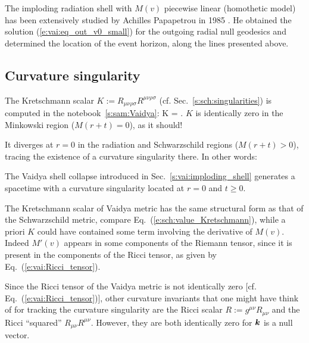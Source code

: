 \begin{hist}
The imploding radiation shell with $M(v)$ piecewise linear (homothetic model)
has been extensively
studied by Achilles Papapetrou in 1985 \cite{Papap85}.
He obtained the solution (\ref{e:vai:eq_out_v0_small}) for the outgoing radial
null geodesics and determined the location of the event horizon, along
the lines presented above.
\end{hist}

\subsection{Curvature singularity} \label{s:vai:thin:sing}

The Kretschmann scalar
$K := R_{\mu\nu\rho\sigma} R^{\mu\nu\rho\sigma}$
(cf. Sec.~\ref{s:sch:singularities})
is computed in the notebook~\ref{s:sam:Vaidya}:
\be \label{e:vai:Kretschmann}
    K =  .
\ee
$K$ is identically zero in the Minkowski region ($M(r+t) = 0$), as it should!

It diverges at $r=0$ in the radiation and Schwarzschild regions ($M(r+t) > 0$), tracing the
existence of a curvature singularity there.
In other words:
\begin{prop}
The Vaidya shell collapse introduced in Sec.~\ref{s:vai:imploding_shell}
generates a spacetime with a curvature singularity
located at $r=0$ and $t \geq 0$.
\end{prop}

\begin{remark}
The Kretschmann scalar of Vaidya metric has the same structural form
as that of the Schwarzschild metric, compare Eq.~(\ref{e:sch:value_Kretschmann}),
while a priori $K$ could have
contained some term involving the derivative of $M(v)$. Indeed $M'(v)$
appears in some components of the Riemann tensor, since it is present in the
components of the Ricci tensor, as given by Eq.~(\ref{e:vai:Ricci_tensor}).
\end{remark}

\begin{remark}
Since the Ricci tensor of the Vaidya metric is not identically zero
[cf. Eq.~(\ref{e:vai:Ricci_tensor})], other curvature invariants that one might
have think of for tracking the curvature singularity are the Ricci scalar $R := g^{\mu\nu} R_{\mu\nu}$
and the Ricci ``squared'' $R_{\mu\nu} R^{\mu\nu}$. However, they are both identically zero
for $\bm{k}$ is a null vector.
\end{remark}

